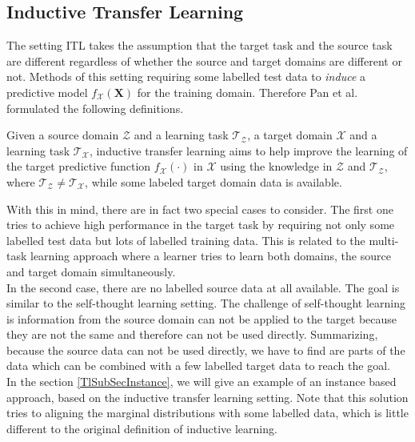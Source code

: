 \subsection{Inductive Transfer Learning}\label{TlSubSecInduc}
The setting \ac{ITL} takes the assumption that the target task and the source task are different regardless of whether the source and target domains are different or not.
Methods of this setting requiring some labelled test data to \textit{induce} a predictive model $f_\mathcal{X}(\mathbf{X})$ for the training domain.\cite{Pan.2010}
Therefore Pan et al. formulated the following definitions.
\begin{mDef}\label{DefITL}
	 Given a source domain $\mathcal{Z}$ and a learning task $\mathcal{T_Z}$, a target domain $\mathcal{X}$ and a learning task $\mathcal{T_X}$, inductive transfer learning aims to help improve the learning of the target predictive function $f_\mathcal{X}(\cdot)$ in $\mathcal{X}$ using the knowledge in $\mathcal{Z}$ and $\mathcal{T_Z}$, where $\mathcal{T_Z} \neq \mathcal{T_X}$, while some labeled target domain data is available.
\end{mDef} 
With this in mind, there are in fact two special cases to consider.
The first one tries to achieve high performance in the target task by requiring not only some labelled test data but lots of labelled training data.
This is related to the multi-task learning approach where a learner tries to learn both domains, the source and target domain simultaneously.\cite{Pan.2010}\\
In the second case, there are no labelled source data at all available.
The goal is similar to the self-thought learning setting.
The challenge of self-thought learning is information from the source domain can not be applied to the target because they are not the same and therefore can not be used directly.
Summarizing, because the source data can not be used directly, we have to find are parts of the data which can be combined with a few labelled target data to reach the goal.\cite{Pan.2010}\\
In the section \ref{TlSubSecInstance}, we will give an example of an instance based approach, based on the inductive transfer learning setting.
Note that this solution tries to aligning the marginal distributions with some labelled data, which is little different to the original definition of inductive learning.

